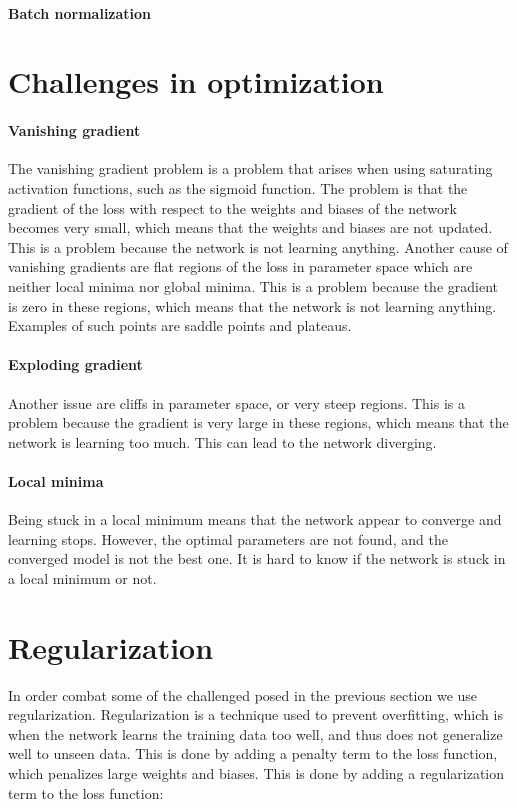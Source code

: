         \paragraph{Batch normalization}


    \section{Challenges in optimization}

        \paragraph{Vanishing gradient}
            The vanishing gradient problem is a problem that arises when using saturating activation functions, such as the sigmoid function. The problem is that the gradient of the loss with respect to the weights and biases of the network becomes very small, which means that the weights and biases are not updated. This is a problem because the network is not learning anything. Another cause of vanishing gradients are flat regions of the loss in parameter space which are neither local minima nor global minima. This is a problem because the gradient is zero in these regions, which means that the network is not learning anything. Examples of such points are saddle points and plateaus. 

        \paragraph{Exploding gradient}
            Another issue are cliffs in parameter space, or very steep regions. This is a problem because the gradient is very large in these regions, which means that the network is learning too much. This can lead to the network diverging.

        \paragraph{Local minima}
            Being stuck in a local minimum means that the network appear to converge and learning stops. However, the optimal parameters are not found, and the converged model is not the best one. It is hard to know if the network is stuck in a local minimum or not.

\section{Regularization}
    In order combat some of the challenged posed in the previous section we use regularization. Regularization is a technique used to prevent overfitting, which is when the network learns the training data too well, and thus does not generalize well to unseen data. This is done by adding a penalty term to the loss function, which penalizes large weights and biases. This is done by adding a regularization term to the loss function:

